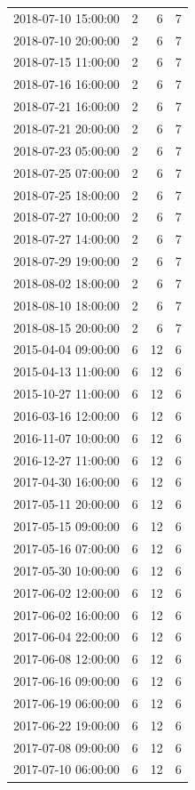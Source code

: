 \begin{tabular}{lrrr}
2018-07-10 15:00:00 & 2 & 6 & 7 \\
2018-07-10 20:00:00 & 2 & 6 & 7 \\
2018-07-15 11:00:00 & 2 & 6 & 7 \\
2018-07-16 16:00:00 & 2 & 6 & 7 \\
2018-07-21 16:00:00 & 2 & 6 & 7 \\
2018-07-21 20:00:00 & 2 & 6 & 7 \\
2018-07-23 05:00:00 & 2 & 6 & 7 \\
2018-07-25 07:00:00 & 2 & 6 & 7 \\
2018-07-25 18:00:00 & 2 & 6 & 7 \\
2018-07-27 10:00:00 & 2 & 6 & 7 \\
2018-07-27 14:00:00 & 2 & 6 & 7 \\
2018-07-29 19:00:00 & 2 & 6 & 7 \\
2018-08-02 18:00:00 & 2 & 6 & 7 \\
2018-08-10 18:00:00 & 2 & 6 & 7 \\
2018-08-15 20:00:00 & 2 & 6 & 7 \\
2015-04-04 09:00:00 & 6 & 12 & 6 \\
2015-04-13 11:00:00 & 6 & 12 & 6 \\
2015-10-27 11:00:00 & 6 & 12 & 6 \\
2016-03-16 12:00:00 & 6 & 12 & 6 \\
2016-11-07 10:00:00 & 6 & 12 & 6 \\
2016-12-27 11:00:00 & 6 & 12 & 6 \\
2017-04-30 16:00:00 & 6 & 12 & 6 \\
2017-05-11 20:00:00 & 6 & 12 & 6 \\
2017-05-15 09:00:00 & 6 & 12 & 6 \\
2017-05-16 07:00:00 & 6 & 12 & 6 \\
2017-05-30 10:00:00 & 6 & 12 & 6 \\
2017-06-02 12:00:00 & 6 & 12 & 6 \\
2017-06-02 16:00:00 & 6 & 12 & 6 \\
2017-06-04 22:00:00 & 6 & 12 & 6 \\
2017-06-08 12:00:00 & 6 & 12 & 6 \\
2017-06-16 09:00:00 & 6 & 12 & 6 \\
2017-06-19 06:00:00 & 6 & 12 & 6 \\
2017-06-22 19:00:00 & 6 & 12 & 6 \\
2017-07-08 09:00:00 & 6 & 12 & 6 \\
2017-07-10 06:00:00 & 6 & 12 & 6 \\

\end{tabular}
